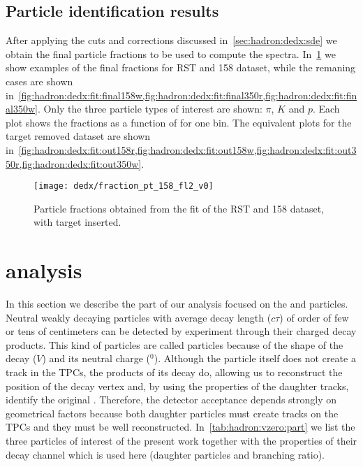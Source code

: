 \subsection{Particle identification results}
\label{sec:hadron:dedx:results}

After applying the cuts and corrections discussed
in~\cref{sec:hadron:dedx:sde} we obtain the final
particle fractions to be used to compute the spectra.
In~\cref{fig:hadron:dedx:fit:final158r} we show examples
of the final fractions for RST and 158 \GeVc dataset,
while the remaning cases are shown 
in~\cref{fig:hadron:dedx:fit:final158w,fig:hadron:dedx:fit:final350r,fig:hadron:dedx:fit:final350w}.
Only the three particle types of interest are shown: $\pi$, $K$ and $p$.
Each plot shows the fractions as a function of \pp for one \pT bin.
The equivalent plots for the target removed dataset are shown
in~\cref{fig:hadron:dedx:fit:out158r,fig:hadron:dedx:fit:out158w,fig:hadron:dedx:fit:out350r,fig:hadron:dedx:fit:out350w}.

\begin{figure}
  \centering
  \texttt{[image: dedx/fraction\_pt\_158\_fl2\_v0]}
  \caption{Particle fractions obtained from the \dedx fit of the RST and 158 \GeVc dataset, with target inserted.}
  \label{fig:hadron:dedx:fit:final158r}
\end{figure}

\clearpage

\section{\vzero analysis}
\label{sec:hadron:vzero}

In this section we describe the part of our analysis
focused on the \lambs and \kzeros particles.
Neutral weakly decaying particles with average decay length ($c\tau$)
of order of few or tens of centimeters can be detected by \NASixtyOne
experiment through their charged decay products. This kind of
particles are called \vzero particles because of the shape of
the decay ($V$) and its neutral charge ($^0$). Although the \vzero
particle itself does not create a track in the TPCs, the products
of its decay do, allowing us to reconstruct the position of the
decay vertex and, by using the properties of the daughter tracks,
identify the original \vzero. Therefore, the detector acceptance
depends strongly on geometrical factors because both daughter particles
must create tracks on the TPCs and they must be well reconstructed. 
In~\cref{tab:hadron:vzero:part} we list the three \vzero particles of interest
of the present work together with the properties of their decay channel
which is used here (daughter particles and branching ratio). 



